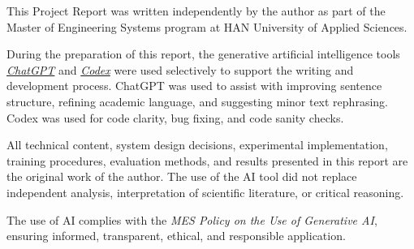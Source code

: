 This Project Report was written independently by the author as part of the Master of Engineering Systems program at HAN University of Applied Sciences.  

During the preparation of this report, the generative artificial intelligence tools
\href{https://openai.com/chatgpt/}{\textit{ChatGPT}} and
\href{https://openai.com/codex/}{\textit{Codex}} were used selectively to support
the writing and development process. ChatGPT was used to assist with
improving sentence structure, refining academic language, and suggesting minor text
rephrasing. Codex was used for code clarity, bug fixing, and code sanity checks.

All technical content, system design decisions, experimental implementation,
training procedures, evaluation methods, and results presented in this report are
the original work of the author. The use of the AI tool did not replace independent
analysis, interpretation of scientific literature, or critical reasoning.


The use of AI complies with the \textit{MES Policy on the Use of Generative AI}, ensuring informed, transparent, ethical, and responsible application.
